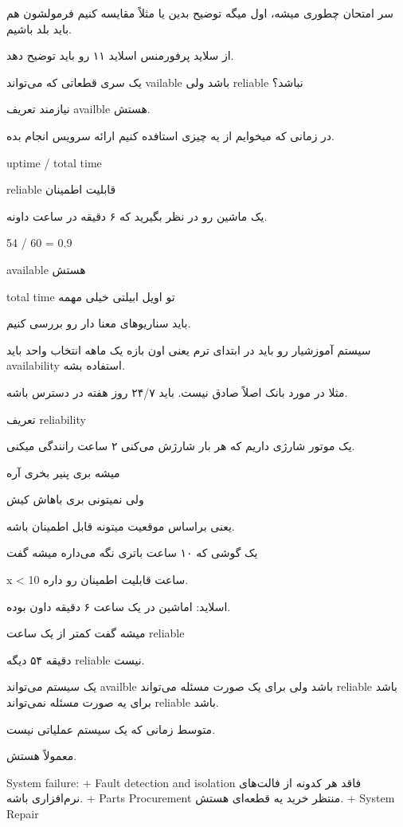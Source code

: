 سر امتحان چطوری میشه، اول میگه توضیح بدین یا مثلاً مقایسه کنیم فرمولشون هم باید
بلد باشیم.

از سلاید پرفورمنس اسلاید ۱۱ رو باید توضیح دهد.

یک سری قطعاتی که می‌تواند vailable باشد ولی reliable نباشد؟

نیازمند تعریف availble هستش.

در زمانی که میخوایم از یه چیزی استافده کنیم ارائه سرویس انجام بده.

uptime / total time

reliable قابلیت اطمینان

یک ماشین رو در نظر بگیرید که ۶ دقیقه در ساعت داونه.

54 / 60 = 0.9 

available هستش

total time تو اویل ابیلتی خیلی مهمه

باید سناریو‌های معنا دار رو بررسی کنیم.

سیستم آموزشیار رو باید در ابتدای ترم یعنی اون بازه یک ماهه انتخاب واحد باید
availability استفاده بشه.

مثلا در مورد بانک اصلاً صادق نیست. باید ۲۴/۷ روز هفته در دسترس باشه.

تعریف reliability

یک موتور شارژی داریم که هر بار شارژش می‌کنی ۲ ساعت رانندگی میکنی.

میشه بری پنیر بخری آره

ولی نمیتونی بری باهاش کیش

یعنی براساس موقعیت میتونه قابل اطمینان باشه.

یک گوشی که ۱۰ ساعت باتری نگه می‌داره میشه گفت

x < 10 ساعت قابلیت اطمینان رو داره.

اسلاید: اماشین در یک ساعت ۶ دقیقه داون بوده.

میشه گفت کمتر از یک ساعت reliable

دقیقه ۵۴ دیگه reliable نیست.

یک سیستم می‌تواند availble باشد ولی برای یک صورت مسئله می‌تواند reliable باشد
برای یه صورت مسئله نمی‌تواند reliable باشد.


متوسط زمانی که یک سیستم عملیاتی نیست.

معمولاً  هستش.

System failure:
+ Fault detection and isolation فاقد هر کدونه از فالت‌های نرم‌افزاری باشه.
+ Parts Procurement منتظر خرید یه قطعه‌ای هستش.
+ System Repair

